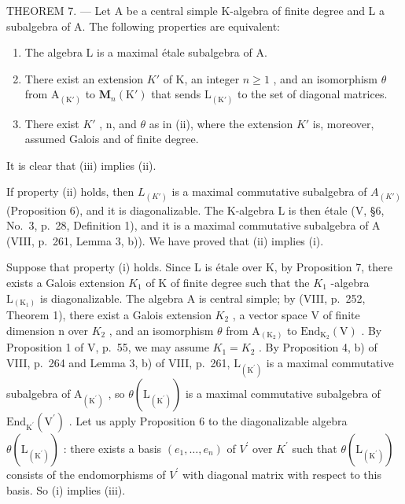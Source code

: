 THEOREM 7. --- Let A be a central simple K-algebra of finite degree and L a subalgebra of A. The following properties are equivalent:

\begin{enumerate}
\def\labelenumi{(\roman{enumi})}
\item
  The algebra L is a maximal étale subalgebra of A.
\item
  There exist an extension \(K'\) of K, an integer \(n \geqslant 1\) , and an isomorphism \(\theta\) from \(\mathrm{A}_{(\mathrm{K}')}\) to \(\mathbf{M}_{n}(\mathrm{K}')\) that sends \(\mathrm{L}_{(\mathrm{K}')}\) to the set of diagonal matrices.
\item
  There exist \(K'\) , n, and \(\theta\) as in (ii), where the extension \(K'\) is, moreover, assumed Galois and of finite degree.
\end{enumerate}

It is clear that (iii) implies (ii).

If property (ii) holds, then \(L_{(K')}\) is a maximal commutative subalgebra of \(A_{(K')}\) (Proposition 6), and it is diagonalizable. The K-algebra L is then étale (V, §6, No.~3, p.~28, Definition 1), and it is a maximal commutative subalgebra of A (VIII, p.~261, Lemma 3, b)). We have proved that (ii) implies (i).

Suppose that property (i) holds. Since L is étale over K, by Proposition 7, there exists a Galois extension \(K_{1}\) of K of finite degree such that the \(K_{1}\) -algebra \(\mathrm{L}_{(\mathrm{K}_{1})}\) is diagonalizable. The algebra A is central simple; by (VIII, p.~252, Theorem 1), there exist a Galois extension \(K_{2}\) , a vector space V of finite dimension n over \(K_{2}\) , and an isomorphism \(\theta\) from \(\mathrm{A}_{(\mathrm{K}_{2})}\) to \(\mathrm{End}_{\mathrm{K}_{2}}(\mathrm{V})\) . By Proposition 1 of V, p.~55, we may assume \(K_{1}=K_{2}\) . By Proposition 4, b) of VIII, p.~264 and Lemma 3, b) of VIII, p.~261, \(\mathrm{L}_{(\mathrm{K}^{\prime})}\) is a maximal commutative subalgebra of \(\mathrm{A}_{(\mathrm{K}^{\prime})}\) , so \(\theta(\mathrm{L}_{(\mathrm{K}^{\prime})})\) is a maximal commutative subalgebra of \(\mathrm{End}_{\mathrm{K}^{\prime}}(\mathrm{V}^{\prime})\) . Let us apply Proposition 6 to the diagonalizable algebra \(\theta(\mathrm{L}_{(\mathrm{K}^{\prime})})\) : there exists a basis \((e_{1},\ldots,e_{n})\) of \(V^{\prime}\) over \(K^{\prime}\) such that \(\theta(\mathrm{L}_{(\mathrm{K}^{\prime})})\) consists of the endomorphisms of \(V^{\prime}\) with diagonal matrix with respect to this basis. So (i) implies (iii).

